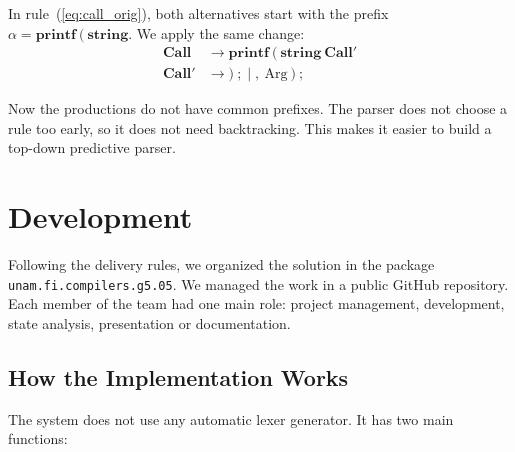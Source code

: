 \documentclass[letterpaper,12pt,oneside]{article}
\begin{document}
In rule~(\ref{eq:call_orig}), both alternatives start with the prefix $\alpha = \mathbf{printf} \ \mathbf{(} \ \mathbf{string}$. We apply the same change:
\begin{align}
    \mathbf{Call} &\to \mathbf{printf} \ \mathbf{(} \ \mathbf{string} \ \mathbf{Call'} \\
    \mathbf{Call'} &\to \mathbf{)} \ \mathbf{;} \;\Big|\; \mathbf{,} \ \text{Arg} \ \mathbf{)} \ \mathbf{;}
\end{align}

Now the productions do not have common prefixes. The parser does not choose a rule too early, so it does not need backtracking. This makes it easier to build a top-down predictive parser.

\section{Development}

Following the delivery rules, we organized the solution in the package \texttt{unam.fi.compilers.g5.05}. We managed the work in a public GitHub repository. Each member of the team had one main role: project management, development, state analysis, presentation or documentation.

\subsection{How the Implementation Works}
The system does not use any automatic lexer generator. It has two main functions:
\end{document}
